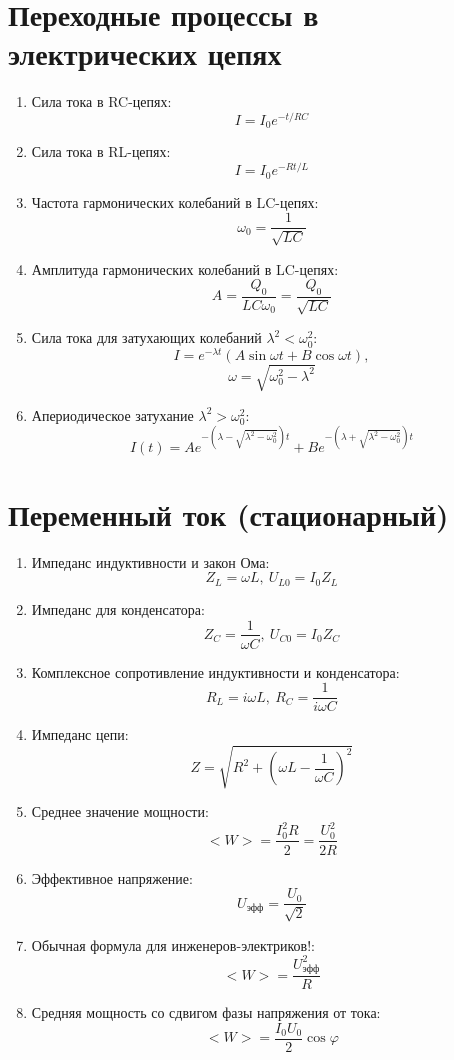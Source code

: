 	\section{Переходные процессы в электрических цепях}
		\begin{enumerate}
			\item Сила тока в RC-цепях: \[ I = I_0 e^{-t/RC} \]
			\item Сила тока в RL-цепях: \[ I = I_0 e^{-Rt/L} \]
			\item Частота гармонических колебаний в LC-цепях: \[ \omega_0 = \frac{1}{\sqrt{LC}} \]
			\item Амплитуда гармонических колебаний в LC-цепях: \[ A = \frac{Q_0}{LC \omega_0} = \frac{Q_0}{\sqrt{LC}} \]
			\item Сила тока для затухающих колебаний $\lambda^2 < \omega^2_0$: \[ I = e^{- \lambda t} \left( A \sin{\omega t} + B \cos{\omega t} \right), \] \[ \omega = \sqrt{\omega_0^2 - \lambda^2} \]
			\item Апериодическое затухание $\lambda^2 > \omega^2_0$: \[ I(t) = A e^{-\left(\lambda - \sqrt{\lambda^2 - \omega_0^2} \right) t} + B e^{- \left( \lambda + \sqrt{\lambda^2 - \omega_0^2} \right) t} \]
		\end{enumerate}
		
	\section{Переменный ток (стационарный)}
		\begin{enumerate}
			\item Импеданс индуктивности и закон Ома: \[ Z_L = \omega L, \ U_{L0} = I_0 Z_L \]
			\item Импеданс для конденсатора: \[ Z_C = \frac{1}{\omega C}, \ U_{C0} = I_0 Z_C \]
			\item Комплексное сопротивление индуктивности и конденсатора: \[ R_L = i \omega L, \ R_C = \frac{1}{i \omega C} \]
			\item Импеданс цепи: \[ Z = \sqrt{R^2 + \left( \omega L - \frac{1}{\omega C} \right)^2 } \]
			\item Среднее значение мощности: \[ <W> = \frac{I_0^2 R}{2} = \frac{U_0^2}{2R} \]
			\item Эффективное напряжение: \[ U_{\text{эфф}} = \frac{U_0}{\sqrt{2}}\]
			\item Обычная формула для инженеров-электриков!: \[ <W> = \frac{U^2_{\text{эфф}}}{R} \]
			\item Средняя мощность со сдвигом фазы напряжения от тока: \[ <W> = \frac{I_0 U_0}{2} \cos{\varphi} \]
		\end{enumerate}
	
